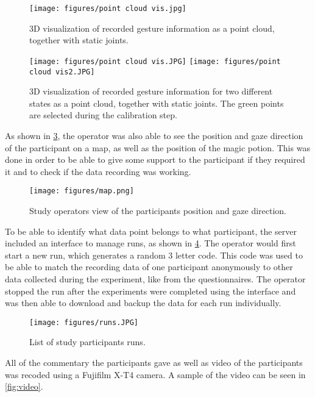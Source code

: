 \begin{figure}[!ht]
    \centering
    \texttt{[image: figures/point cloud vis.jpg]}
    \caption{3D visualization of recorded gesture information as a point cloud, together with static joints.}
    \label{fig:vis}
\end{figure}
\begin{figure}[!htb]
        \texttt{[image: figures/point cloud vis.JPG]}
    \endminipage\hfill
        \texttt{[image: figures/point cloud vis2.JPG]}
        \label{fig:vis}
    \endminipage\hfill
    \caption{3D visualization of recorded gesture information for two different states as a point cloud, together with static joints. The green points are selected during the calibration step.}
\end{figure}

As shown in \ref{fig:map}, the operator was also able to see the position and gaze direction of the participant on a map, as well as the position of the magic potion. This was done in order to be able to give some support to the participant if they required it and to check if the data recording was working. 

\begin{figure}[!ht]
    \centering
    \texttt{[image: figures/map.png]}
    \caption{Study operators view of the participants position and gaze direction.}
    \label{fig:map}
\end{figure}

To be able to identify what data point belongs to what participant, the server included an interface to manage runs, as shown in \ref{fig:runs}. The operator would first start a new run, which generates a random 3 letter code. This code was used to be able to match the recording data of one participant anonymously to other data collected during the experiment, like from the questionnaires. The operator stopped the run after the experiments were completed using the interface and was then able to download and backup the data for each run individually.

\begin{figure}[!ht]
    \centering
    \texttt{[image: figures/runs.JPG]}
    \caption{List of study participants runs.}
    \label{fig:runs}
\end{figure}

All of the commentary the participants gave as well as video of the participants was recoded using a Fujifilm X-T4 camera. A sample of the video can be seen in \ref{fig:video}.

